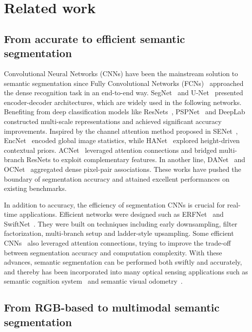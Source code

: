 \documentclass{osa-article}
\begin{document}
\section{Related work}

\subsection{From accurate to efficient semantic segmentation}

Convolutional Neural Networks (CNNs) have been the mainstream solution to semantic segmentation since Fully Convolutional Networks (FCNs)~\cite{long2015fully} approached the dense recognition task in an end-to-end way.
SegNet~\cite{badrinarayanan2017segnet} and U-Net~\cite{ronneberger2015u} presented encoder-decoder architectures, which are widely used in the following networks.
Benefiting from deep classification models like ResNets~\cite{he2016deep}, PSPNet~\cite{zhao2017pyramid} and DeepLab~\cite{chen2017deeplab} constructed multi-scale representations and achieved significant accuracy improvements.
Inspired by the channel attention method proposed in SENet~\cite{hu2018squeeze}, EncNet~\cite{zhang2018context} encoded global image statistics, while HANet~\cite{choi2020cars} explored height-driven contextual priors.
ACNet~\cite{hu2019acnet} leveraged attention connections and bridged multi-branch ResNets to exploit complementary features.
In another line, DANet~\cite{fu2019dual} and OCNet~\cite{yuan2018ocnet} aggregated dense pixel-pair associations.
These works have pushed the boundary of segmentation accuracy and attained excellent performances on existing benchmarks.

In addition to accuracy, the efficiency of segmentation CNNs is crucial for real-time applications.
Efficient networks were designed such as ERFNet~\cite{romera2018erfnet} and SwiftNet~\cite{orvsic2019defense}.
They were built on techniques including early downsampling, filter factorization, multi-branch setup and ladder-style upsampling.
Some efficient CNNs~\cite{yang2019ds,sun2020real} also leveraged attention connections, trying to improve the trade-off between segmentation accuracy and computation complexity.
With these advances, semantic segmentation can be performed both swiftly and accurately, and thereby has been incorporated into many optical sensing applications such as semantic cognition system~\cite{yang2019robustifying} and semantic visual odometry~\cite{yang2019ds,chen2019palvo}.

\subsection{From RGB-based to multimodal semantic segmentation}
\end{document}
